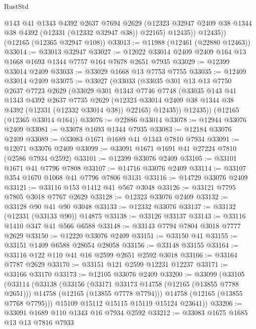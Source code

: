 \begin{lexlean}{RustStd}
\begin{coremodule}
            @143
            @41
            @1343
            @4392
            @2637
            @7694
            @2629
            (@12323 @32947 @2409 @38 @1344 @38 @4392 (@12331 (@12332 @32947 @38)) @22165)
            @12435))
        @12435))
    (@12165 (@12365 @32947 @108))
@33013 := @11988 (@12461 (@22880 @12463))
@33014 := @33013 @32947
@33027 := @12022 @33014 @2409 @2409 @164 @13 @1668 @1693 @1344 @7757 @164 @7678 @2651 @7935
@33029 := @12399 @33014 @2409
@33033 := @33029 @1668 @13 @7753 @7755
@33035 := @12409 @33014 @2409
@33075 := @33027
    (@33033
      (@33035
        @301
        @13
        @13
        @7750
        @2637
        @7723
        @2629
        (@33029
          @301
          @1343
          @7746
          @7748
          (@33035
            @143
            @41
            @1343
            @4392
            @2637
            @7735
            @2629
            (@12323 @33014 @2409 @38 @1344 @38 @4392 (@12331 (@12332 @33014 @38)) @22165)
            @12435))
        @12435))
    (@12165 (@12365 @33014 @164))
@33076 := @22886 @33014
@33078 := @12944 @33076 @2409
@33081 := @33078 @1693 @1344 @7935
@33083 := @12184 @33076 @2409
@33089 := @33083 @1671 @1689 @41 @1343 @7810 @7934
@33091 := @12071 @33076 @2409
@33099 := @33091 @1671 @1691 @41 @27224 @7810 (@2586 @7934 @2592)
@33101 := @12399 @33076 @2409
@33105 := @33101 @1671 @41 @7796 @7808
@33107 := @14716 @33076 @2409
@33114 := @33107 @354 @1670 @1068 @41 @7796 @7806 @3131
@33116 := @14729 @33076 @2409
@33121 := @33116 @153 @1412 @41 @567 @3048
@33126 := @33121 @7795 @7805 @3018 @7767 @2629
@33128 := @12323 @33076 @2409
@33132 := @33128 @90 @41 @90 @3048
@33133 := @12332 @33076
@33137 := @33132 (@12331 (@33133 @90)) @14875
@33138 := @33126 @33137
@33143 := @33116 @1410 @347 @41 @566 @6588
@33148 := @33143 @7794 @7804 @3018 @7777 @2629
@33150 := @12220 @33076 @2409
@33151 := @33150 @41
@33155 := @33151 @1409 @6588 @28054 @28058
@33156 := @33148 @33155
@33164 := @33116 @122 @110 @41 @16 @2599 @2651 @2592 @3018
@33166 := @33164 @7787 @2629
@33170 := @33151 @121 @2599 @12231 @12237
@33171 := @33166 @33170
@33173 := @12105 @33076 @2409
@33200 := @33099
    (@33105
      (@33114
        (@33138
          (@33156
            (@33171 @33173 @14758 (@12165 (@13855 @7788 @2651)))
            @14758
            (@12165 (@13855 @7778 @7794)))
          @14758
          (@12165 (@13855 @7768 @7795)))
        @15109
        @15112
        @15115
        @15119
        @15124
        @23641))
@33206 := @33091 @1689 @110 @1343 @16 @7934 @2592
@33212 := @33083 @1675 @1685 @13 @13 @7816 @7933

\end{coremodule}
\end{lexlean}
